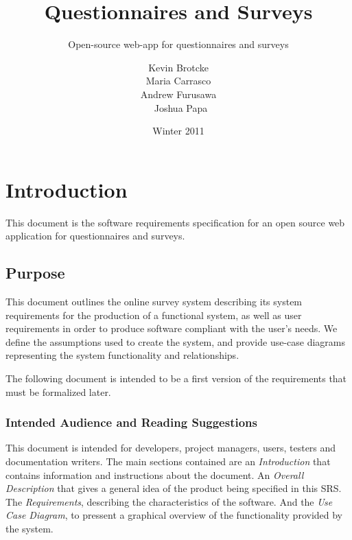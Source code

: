 \documentclass[a4paper,12pt,oneside]{report}
\title{Questionnaires and Surveys}
\subtitle{Open-source web-app for questionnaires and surveys}
\date{Winter 2011}
\author{Kevin Brotcke\\
Maria Carrasco\\
Andrew Furusawa\\\
Joshua Papa }
\begin{document}
   
\renewcommand{\contentsname}{Contents}
\renewcommand{\bibname}{Bibliography}
\renewcommand{\caption}{{\bf Caption : }}

\raskolnikovmaketitle
\tableofcontents

\chapter{Introduction}
This document is the software requirements specification for an open source web application for questionnaires and surveys.

\section{Purpose}
This document outlines the online survey system describing its system requirements for the production of  a functional system, as well as user requirements in order to produce software compliant with the user's needs. We define the assumptions used to create the system, and provide use-case diagrams representing the system functionality and relationships.

The following  document is intended to be a first version of the requirements that must be formalized later. 

\subsection{Intended Audience and Reading Suggestions}
This document is intended for developers, project managers, users, testers and documentation writers. The main sections contained are an {\it Introduction} that contains information and instructions about the document. An {\it Overall Description} that gives a general idea of the product being specified in this SRS. The {\it Requirements}, describing the characteristics of the software. And the {\it Use Case Diagram}, to pressent a graphical overview of the functionality provided by the system.
\end{document}
